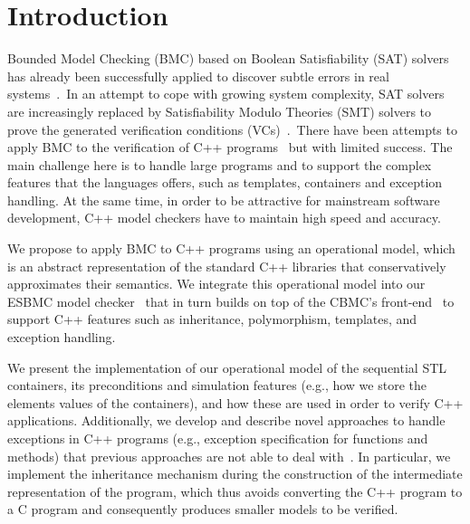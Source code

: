 \documentclass[a4paper]{llncs}
\newcommand{\comment}[1]{}
\begin{document}
\section{Introduction}
%
Bounded Model Checking (BMC) based on Boolean Satisfiability (SAT) solvers
has already been successfully applied to discover
subtle errors in real systems~\cite{handbook09}.\ In an attempt to cope
with growing system complexity, SAT solvers are increasingly
replaced by Satisfiability Modulo Theories (SMT) solvers to prove the generated
verification conditions (VCs)~\cite{Armando09,Ganai06,Cordeiro12}.\
There have been attempts to apply BMC to the verification of C++
programs~\cite{Florian12,Yang12} but with limited success. The main challenge
here is to handle large programs and to support the complex features that the
languages offers, such as templates, containers and exception handling.
At the same time,
in order to be attractive for mainstream software development,
C++ model checkers have to maintain
high speed and accuracy.

\comment{
C++ is widely used, but systems that use C++
tend to require a high verification effort. C++
verification involves many more challenges than that of plain ANSI-C since the language provides
a wider set of features (e.g., object-oriented programming), libraries (e.g., specialized
input-output), and functionalities (e.g., templates). }


We propose to apply BMC to C++ programs using an operational model, which
is an abstract representation of the standard C++ libraries that
conservatively approximates their semantics. We integrate this operational model
into our ESBMC model checker~\cite{Cordeiro12} that in turn builds on top
of the CBMC's front-end~\cite{Clarke04} to support C++ features such
as inheritance, polymorphism, templates, and exception handling.

We present the implementation of our operational model of the sequential STL
containers, its preconditions and simulation features (e.g., how we store the
elements values of the containers), and how these are used in order to verify
C++ applications.  Additionally, we develop and describe novel approaches to handle
exceptions in C++ programs (e.g., exception specification for
functions and methods) that previous approaches are not able to deal
with~\cite{PrabhuMBIG11,Blanc07,Florian12}. In particular, we implement the
inheritance mechanism during the construction of the intermediate
representation of the program, which thus avoids converting the C++ program
to a C program and consequently produces smaller models to be verified.
%
\end{document}
